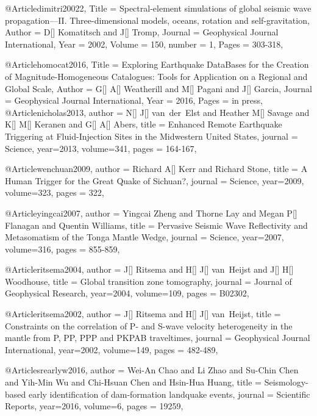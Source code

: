 @Article{dimitri20022,
  Title                    = {Spectral-element simulations of global seismic wave propagation—II. Three-dimensional models, oceans, rotation and self-gravitation},
  Author                   = {D[] Komatitsch and J[] Tromp},
  Journal                  = Geophysical Journal International,
  Year                     = {2002},
  Volume                   = {150},
  number                   = {1},
  Pages                    = {303-318},
}



@Article{homocat2016,
  Title                    = {Exploring Earthquake DataBases for the Creation of Magnitude-Homogeneous Catalogues: Tools for Application on a Regional and Global Scale},
  Author                   = {G[] A[] Weatherill and M[] Pagani and J[] Garcia},
  Journal                  = {Geophysical Journal International},
  Year                     = {2016},
  Pages                    = {in press},
}
@Article{nicholas2013,
  author =	 {N[] J[] van~der~Elst and Heather M[] Savage and K[] M[] Keranen and G[] A[] Abers},
  title =	 {Enhanced Remote Earthquake Triggering at Fluid-Injection Sites in the Midwestern United States},
  journal =	 {Science},
  year=2013,
  volume=341,
  pages =	 {164-167},
}

@Article{wenchuan2009,
  author =	 {Richard A[] Kerr and Richard Stone},
  title =	 {A Human Trigger for the Great Quake of Sichuan?},
  journal =	 {Science},
  year=2009,
  volume=323,
  pages =	 {322},
}

@Article{yingcai2007,
  author =	 {Yingcai Zheng and Thorne Lay and Megan P[] Flanagan and Quentin Williams},
  title =	 {Pervasive Seismic Wave Reflectivity and Metasomatism of the Tonga Mantle Wedge},
  journal =	 {Science},
  year=2007,
  volume=316,
  pages =	 {855-859},
}

@Article{ritsema2004,
  author =	 {J[] Ritsema and H[] J[] van~Heijst and J[] H[] Woodhouse},
  title =	 {Global transition zone tomography},
  journal =	 {Journal of Geophysical Research},
  year=2004,
  volume=109,
  pages =	 {B02302},
}

@Article{ritsema2002,
  author =	 {J[] Ritsema and H[] J[] van~Heijst},
  title =	 {Constraints on the correlation of {P}- and {S}-wave velocity heterogeneity in the mantle from {P}, {PP}, {PPP} and {PKPAB} traveltimes},
  journal =	 {Geophysical Journal International},
  year=2002,
  volume=149,
  pages =	 {482-489},
}

@Article{srearlyw2016,
  author =	 {Wei-An Chao and Li Zhao and Su-Chin Chen and Yih-Min Wu and Chi-Hsuan Chen and Hsin-Hua Huang},
  title =	 {Seismology-based early identification of dam-formation landquake events},
  journal =	 {Scientific Reports},
  year=2016,
  volume=6,
  pages =	 {19259},
}

